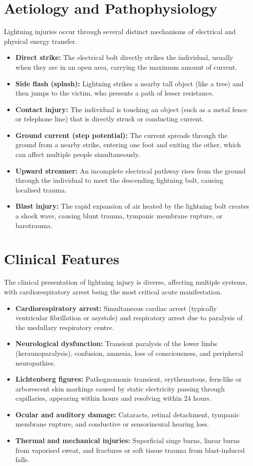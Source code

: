 \section*{Aetiology and Pathophysiology}
Lightning injuries occur through several distinct mechanisms of electrical and physical energy transfer.
\begin{itemize}
    \item \textbf{Direct strike:} The electrical bolt directly strikes the individual, usually when they are in an open area, carrying the maximum amount of current.
    \item \textbf{Side flash (splash):} Lightning strikes a nearby tall object (like a tree) and then jumps to the victim, who presents a path of lesser resistance.
    \item \textbf{Contact injury:} The individual is touching an object (such as a metal fence or telephone line) that is directly struck or conducting current.
    \item \textbf{Ground current (step potential):} The current spreads through the ground from a nearby strike, entering one foot and exiting the other, which can affect multiple people simultaneously.
    \item \textbf{Upward streamer:} An incomplete electrical pathway rises from the ground through the individual to meet the descending lightning bolt, causing localised trauma.
    \item \textbf{Blast injury:} The rapid expansion of air heated by the lightning bolt creates a shock wave, causing blunt trauma, tympanic membrane rupture, or barotrauma.
\end{itemize}

\section*{Clinical Features}
The clinical presentation of lightning injury is diverse, affecting multiple systems, with cardiorespiratory arrest being the most critical acute manifestation.
\begin{itemize}
    \item \textbf{Cardiorespiratory arrest:} Simultaneous cardiac arrest (typically ventricular fibrillation or asystole) and respiratory arrest due to paralysis of the medullary respiratory centre.
    \item \textbf{Neurological dysfunction:} Transient paralysis of the lower limbs (keraunoparalysis), confusion, amnesia, loss of consciousness, and peripheral neuropathies.
    \item \textbf{Lichtenberg figures:} Pathognomonic transient, erythematous, fern-like or arborescent skin markings caused by static electricity passing through capillaries, appearing within hours and resolving within 24 hours.
    \item \textbf{Ocular and auditory damage:} Cataracts, retinal detachment, tympanic membrane rupture, and conductive or sensorineural hearing loss.
    \item \textbf{Thermal and mechanical injuries:} Superficial singe burns, linear burns from vaporised sweat, and fractures or soft tissue trauma from blast-induced falls.
\end{itemize}

